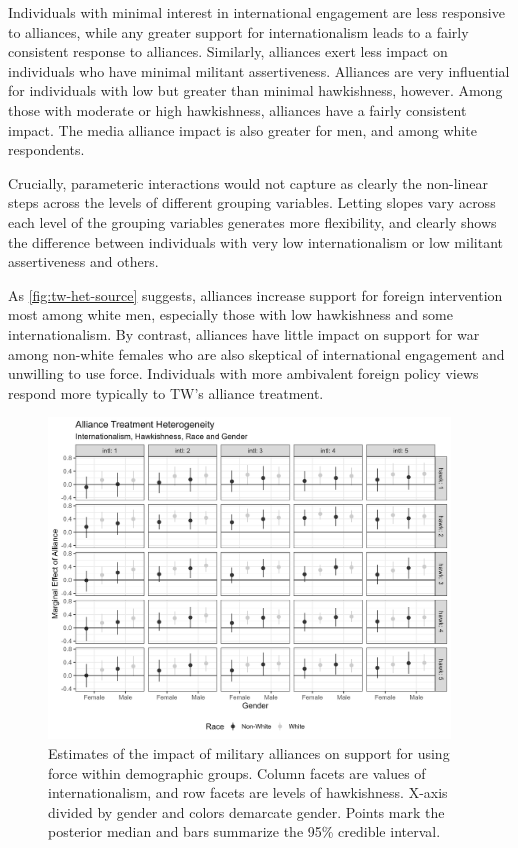 \documentclass[12pt]{article}
\begin{document}
Individuals with minimal interest in international engagement are less responsive to alliances, while any greater support for internationalism leads to a fairly consistent response to alliances. 
Similarly, alliances exert less impact on individuals who have minimal militant assertiveness. 
Alliances are very influential for individuals with low but greater than minimal hawkishness, however. 
Among those with moderate or high hawkishness, alliances have a fairly consistent impact. 
The media alliance impact is also greater for men, and among white respondents. 


Crucially, parameteric interactions would not capture as clearly the non-linear steps across the levels of different grouping variables. 
Letting slopes vary across each level of the grouping variables generates more flexibility, and clearly shows the difference between individuals with very low internationalism or low militant assertiveness and others. 


As \autoref{fig:tw-het-source} suggests, alliances increase support for foreign intervention most among white men, especially those with low hawkishness and some internationalism.
By contrast, alliances have little impact on support for war among non-white females who are also skeptical of international engagement and unwilling to use force.
Individuals with more ambivalent foreign policy views respond more typically to TW's alliance treatment. 


\begin{figure}[htpb]
	\centering
		\includegraphics[width=0.95\textwidth]{../figures/tw-treat-het.png}
	\caption{Estimates of the impact of military alliances on support for using force within demographic groups. Column facets are values of internationalism, and row facets are levels of hawkishness. X-axis divided by gender and colors demarcate gender. Points mark the posterior median and bars summarize the 95\% credible interval.}
	\label{fig:tw-treat-het}
\end{figure}
\end{document}
